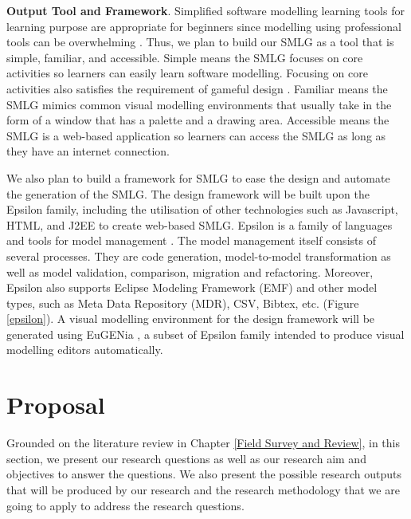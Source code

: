 \documentclass[12pt, a4paper]{report}
\begin{document}
{\textbf{Output Tool and Framework}. Simplified software modelling learning tools for learning purpose are appropriate for beginners since modelling using professional tools can be overwhelming \cite{dranidis2015learning, Akayama2013}. Thus, we plan to build our SMLG as a tool that is simple, familiar, and accessible. Simple means the SMLG focuses on core activities so learners can easily learn software modelling. Focusing on core activities also satisfies the requirement of gameful design \cite{deterding2015lens}. Familiar means the SMLG mimics common visual modelling environments that usually take in the form of a window that has a palette and a drawing area. Accessible means the SMLG is a web-based application so learners can access the SMLG as long as they have an internet connection.

We also plan to build a framework for SMLG to ease the design and automate the generation of the SMLG. The design framework will be built upon the Epsilon family, including the utilisation of other technologies such as Javascript, HTML, and J2EE to create web-based SMLG. Epsilon is a family of languages and tools for model management \cite{kolovos2010epsilon}. The model management itself consists of several processes. They are code generation, model-to-model transformation as well as model validation, comparison, migration and refactoring. Moreover, Epsilon also supports Eclipse Modeling Framework (EMF) and other model types, such as Meta Data Repository (MDR), CSV, Bibtex, etc. (Figure \ref{epsilon}). A visual modelling environment for the design framework will be generated using EuGENia \cite{kolovos2015eugenia}, a subset of Epsilon family intended to produce visual modelling editors automatically.

\chapter{Proposal}
\label{Proposal}
Grounded on the literature review in Chapter \ref{Field Survey and Review}, in this section, we present our research questions as well as our research aim and objectives to answer the questions. We also present the possible research outputs that will be produced by our research and the research methodology that we are going to apply to address the research questions.   

}
\end{document}
